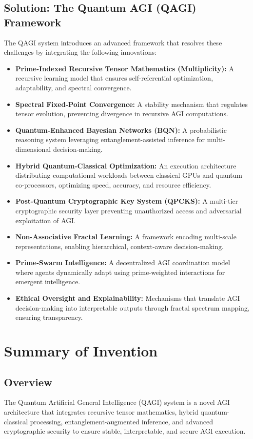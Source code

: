 \documentclass{article}
\theoremstyle{plain}
\theoremstyle{claimstyle}
\begin{document}
\subsection{Solution: The Quantum AGI (QAGI) Framework}
The QAGI system introduces an advanced framework that resolves these challenges by integrating 
the following innovations:
\begin{itemize}
\item \textbf{Prime-Indexed Recursive Tensor Mathematics (Multiplicity):} A recursive learning model that ensures 
      self-referential optimization, adaptability, and spectral convergence.
\item \textbf{Spectral Fixed-Point Convergence:} A stability mechanism that regulates tensor evolution, preventing
      divergence in recursive AGI computations.
\item \textbf{Quantum-Enhanced Bayesian Networks (BQN):} A probabilistic reasoning system leveraging 
      entanglement-assisted inference for multi-dimensional decision-making.
\item \textbf{Hybrid Quantum-Classical Optimization:} An execution architecture distributing computational workloads
      between classical GPUs and quantum co-processors, optimizing speed, accuracy, and resource efficiency.
\item \textbf{Post-Quantum Cryptographic Key System (QPCKS):} A multi-tier cryptographic security layer preventing
      unauthorized access and adversarial exploitation of AGI.
\item \textbf{Non-Associative Fractal Learning:} A framework encoding multi-scale representations, enabling
      hierarchical, context-aware decision-making.
\item \textbf{Prime-Swarm Intelligence:} A decentralized AGI coordination model where agents dynamically adapt using
      prime-weighted interactions for emergent intelligence.
\item \textbf{Ethical Oversight and Explainability:} Mechanisms that translate AGI decision-making into interpretable
      outputs through fractal spectrum mapping, ensuring transparency.
\end{itemize}

\section{Summary of Invention}

\subsection{Overview}
The Quantum Artificial General Intelligence (QAGI) system is a novel AGI architecture that integrates
recursive tensor mathematics, hybrid quantum-classical processing, entanglement-augmented inference,
and advanced cryptographic security to ensure stable, interpretable, and secure AGI execution.
\end{document}
